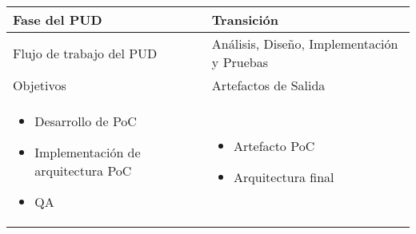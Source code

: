 \vspace{1cm}
\begin{tabular}{|p{}|p{}|}

\hline

\cellcolor[gray]{0.7}Fase del \acs{PUD} & Transición
 \\
\hline

\cellcolor[gray]{0.7}Flujo de trabajo del \acs{PUD} & Análisis, Diseño,
Implementación y Pruebas
 \\
\hline


\cellcolor[gray]{0.7}Objetivos  &
\cellcolor[gray]{0.7}Artefactos de Salida \\
\hline

\begin{itemize}
\item Desarrollo de \acs{PoC}
\item Implementación de arquitectura \acs{PoC}
\item \acs{QA}
\end{itemize}

&

\begin{itemize}
\item Artefacto \acs{PoC}
\item Arquitectura final
\end{itemize}
\\
\hline
\end{tabular}


